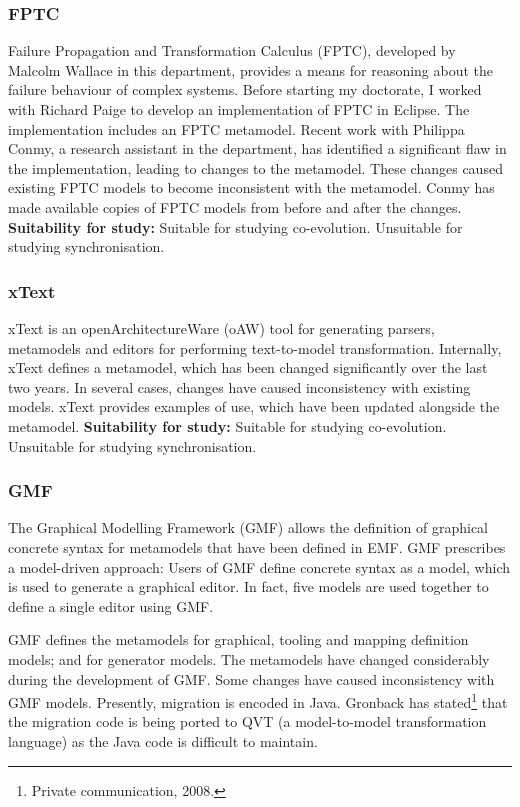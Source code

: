 \subsubsection{FPTC}
Failure Propagation and Transformation Calculus (FPTC), developed by Malcolm Wallace in this department, provides a means for reasoning about the failure behaviour of complex systems. Before starting my doctorate, I worked with Richard Paige to develop an implementation of FPTC in Eclipse. The implementation includes an FPTC metamodel. Recent work with Philippa Conmy, a research assistant in the department, has identified a significant flaw in the implementation, leading to changes to the metamodel. These changes caused existing FPTC models to become inconsistent with the metamodel. Conmy has made available copies of FPTC models from before and after the changes. \textbf{Suitability for study:} Suitable for studying co-evolution. Unsuitable for studying synchronisation.

\subsubsection{xText}
xText is an openArchitectureWare (oAW) \cite{oaw} tool for generating parsers, metamodels and editors for performing text-to-model transformation. Internally, xText defines a metamodel, which has been changed significantly over the last two years. In several cases, changes have caused inconsistency with existing models. xText provides examples of use, which have been updated alongside the metamodel. \textbf{Suitability for study:} Suitable for studying co-evolution. Unsuitable for studying synchronisation.

\subsubsection{GMF}
The Graphical Modelling Framework (GMF) \cite{gronback06gmf} allows the definition of graphical concrete syntax for metamodels that have been defined in EMF. GMF prescribes a model-driven approach: Users of GMF define concrete syntax as a model, which is used to generate a graphical editor. In fact, five models are used together to define a single editor using GMF.

GMF defines the metamodels for graphical, tooling and mapping definition models; and for generator models. The metamodels have changed considerably during the development of GMF. Some changes have caused inconsistency with GMF models. Presently, migration is encoded in Java. Gronback has stated\footnote{Private communication, 2008.} that the migration code is being ported to QVT (a model-to-model transformation language) as the Java code is difficult to maintain.

